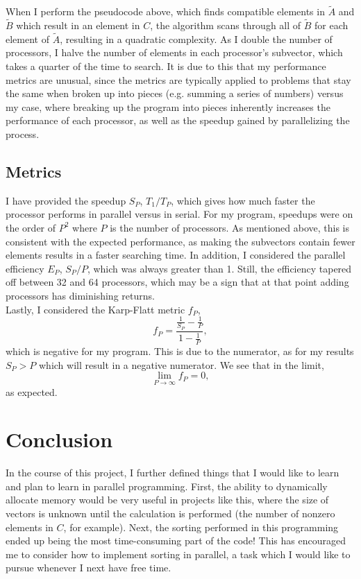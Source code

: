 \documentclass{article}
\begin{document}
When I perform the pseudocode above, which finds compatible elements in
$\tilde{A}$ and $\tilde{B}$ which result in an element in $C$, the algorithm
scans through all of $\tilde{B}$ for each element of $\tilde{A}$, resulting in a
quadratic complexity. As I double the number of processors, I halve the
number of elements in each processor's subvector, which takes a quarter of the
time to search. It is due to this that my performance metrics are unusual, since
the metrics are typically applied to problems that stay the same when broken up
into pieces (e.g. summing a series of numbers) versus my case, where breaking up
the program into pieces inherently increases the performance of each processor,
as well as the speedup gained by parallelizing the process.

\subsection{Metrics}
I have provided the speedup $S_P$, $T_1/T_P$, which gives how much faster the
processor performs in parallel versus in serial. For my program, speedups were
on the order of $P^2$ where $P$ is the number of processors. As mentioned above,
this is consistent with the expected performance, as making the subvectors
contain fewer elements results in a faster searching time. In addition, I
considered the parallel efficiency $E_P$, $S_P/P$, which was always greater than
1. Still, the efficiency tapered off between 32 and 64 processors, which may be
a sign that at that point adding processors has diminishing returns. \\

Lastly, I considered the Karp-Flatt metric $f_P$, $$f_P = \frac{\frac{1}{S_P} -
\frac{1}{P}}{1-\frac{1}{P}},$$ which is negative for my program. This is due to
the numerator, as for my results $S_P > P$ which will result in a negative
numerator. We see that in the limit, $$\lim_{P\to \infty}f_P = 0,$$ as expected.

\section{Conclusion}
In the course of this project, I further defined things that I would like to
learn and plan to learn in parallel programming. First, the ability to
dynamically allocate memory would be very useful in projects like this, where
the size of vectors is unknown until the calculation is performed (the number of
nonzero elements in $C$, for example). Next, the sorting performed in this
programming ended up being the most time-consuming part of the code! This has
encouraged me to consider how to implement sorting in parallel, a task which I
would like to pursue whenever I next have free time. \\
\end{document}
